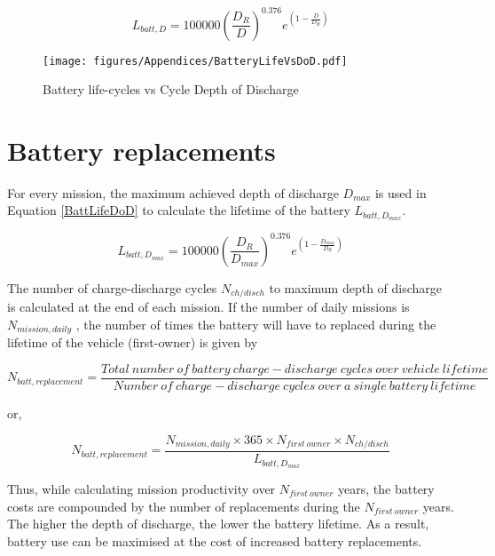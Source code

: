 \documentclass[ExampleMasters.tex]{subfiles}
\begin{document}
		\begin{equation}
			L_{batt, D} = 100000 \left(\frac{D_R}{D}\right)^{0.376} e^{\left(1-\frac{D}{D_R}\right)}
			\label{BattLifeDoD}
		\end{equation}

		\begin{figure}[ht!]
			\centering
			\texttt{[image: figures/Appendices/BatteryLifeVsDoD.pdf]}
			\caption{Battery life-cycles vs Cycle Depth of Discharge}
			\label{BattLifeVsDoD}
		\end{figure}

	\section{Battery replacements}
		For every mission, the maximum achieved depth of discharge $D_{max}$ is used in Equation \eqref{BattLifeDoD} to calculate the lifetime of the battery $L_{batt, D_{max}}$. 

		\begin{equation}
			L_{batt, D_{max}} = 100000 \left(\frac{D_R}{D_{max}}\right)^{0.376} e^{\left(1-\frac{D_{max}}{D_R}\right)}
		\end{equation}

		The number of charge-discharge cycles $N_{ch/disch}$ to maximum depth of discharge is calculated at the end of each mission.  If the number of daily missions is $N_{mission, daily}$ , the number of times the battery will have to replaced during the lifetime of the vehicle (first-owner) is given by

		\begin{equation}
			N_{batt, replacement} = \frac{Total\  number \ of \ battery\  charge-discharge \ cycles\  over\  vehicle \ lifetime}{Number\  of\  charge-discharge\  cycles\  over \ a \ single\  battery\  lifetime}
		\end{equation}
		
		or,

		\begin{equation}
			N_{batt, replacement} = \frac{N_{mission, daily} \times 365 \times N_{first\ owner} \times N_{ch/disch}}{L_{batt, D_{max}}}
		\end{equation}

		Thus, while calculating mission productivity over $N_{first\ owner}$ years, the battery costs are compounded by the number of replacements during the $N_{first\ owner}$ years. The higher the depth of discharge, the lower the battery lifetime. As a result, battery use can be maximised at the cost of increased battery replacements.\\

	\newpage
\end{document}
